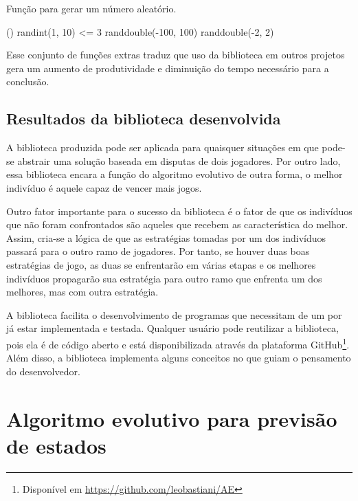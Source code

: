 \begin{algoritmo}
\caption{Função para gerar um número aleatório.}
\label{algoritmo:surprise}
    \If()
    {randint(1, 10) <= 3} {
        \Return randdouble(-100, 100)
    }
    \Return randdouble(-2, 2)
\end{algoritmo}

Esse conjunto de funções extras traduz que uso da biblioteca em outros projetos gera um aumento de produtividade e diminuição do tempo necessário para a conclusão.

\subsection{Resultados da biblioteca desenvolvida}

A biblioteca produzida pode ser aplicada para quaisquer situações em que pode-se abstrair uma solução baseada em disputas de dois jogadores. Por outro lado, essa biblioteca encara a função \fitness do algoritmo evolutivo de outra forma, o melhor indivíduo é aquele capaz de vencer mais jogos.

Outro fator importante para o sucesso da biblioteca é o fator de que os indivíduos que não foram confrontados são aqueles que recebem as característica do melhor. Assim, cria-se a lógica de que as estratégias tomadas por um dos indivíduos passará para o outro ramo de jogadores. Por tanto, se houver duas boas estratégias de jogo, as duas se enfrentarão em várias etapas e os melhores indivíduos propagarão sua estratégia para outro ramo que enfrenta um dos melhores, mas com outra estratégia.

A biblioteca facilita o desenvolvimento de programas que necessitam de um \SE por já estar implementada e testada. Qualquer usuário pode reutilizar a biblioteca, pois ela é de código aberto e está disponibilizada através da plataforma GitHub\footnote{Disponível em \url{https://github.com/leobastiani/AE}}. Além disso, a biblioteca implementa alguns conceitos no \SE que guiam o pensamento do desenvolvedor.

\section{Algoritmo evolutivo para previsão de estados}

